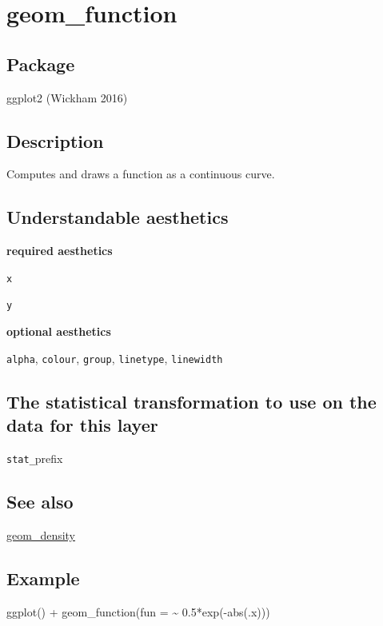\documentclass[
  letterpaper,
  DIV=11,
  numbers=noendperiod]{scrreprt}
\newenvironment{Shaded}{\begin{snugshade}}{\end{snugshade}}
\newcommand{\AttributeTok}[1]{\textcolor[rgb]{0.40,0.45,0.13}{#1}}
\newcommand{\FloatTok}[1]{\textcolor[rgb]{0.68,0.00,0.00}{#1}}
\newcommand{\FunctionTok}[1]{\textcolor[rgb]{0.28,0.35,0.67}{#1}}
\newcommand{\NormalTok}[1]{\textcolor[rgb]{0.00,0.23,0.31}{#1}}
\newcommand{\SpecialCharTok}[1]{\textcolor[rgb]{0.37,0.37,0.37}{#1}}
\begin{document}
\section{geom\_function}\label{function}

\subsection{Package}\label{package-4}

ggplot2 (Wickham 2016)

\subsection{Description}\label{description-4}

Computes and draws a function as a continuous curve.

\subsection{Understandable
aesthetics}\label{understandable-aesthetics-5}

\textbf{required aesthetics}

\texttt{x}

\texttt{y}

\textbf{optional aesthetics}

\texttt{alpha}, \texttt{colour}, \texttt{group}, \texttt{linetype},
\texttt{linewidth}

\subsection{The statistical transformation to use on the data for this
layer}\label{the-statistical-transformation-to-use-on-the-data-for-this-layer-4}

\texttt{stat\_}prefix

\subsection{See also}\label{see-also-4}

\hyperref[density]{geom\_density}

\subsection{Example}\label{example-5}

\begin{Shaded}
\begin{Highlighting}[]
\FunctionTok{ggplot}\NormalTok{() }\SpecialCharTok{+} 
  \FunctionTok{geom\_function}\NormalTok{(}\AttributeTok{fun =} \SpecialCharTok{\textasciitilde{}} \FloatTok{0.5}\SpecialCharTok{*}\FunctionTok{exp}\NormalTok{(}\SpecialCharTok{{-}}\FunctionTok{abs}\NormalTok{(.x)))}
\end{Highlighting}
\end{Shaded}
\end{document}
